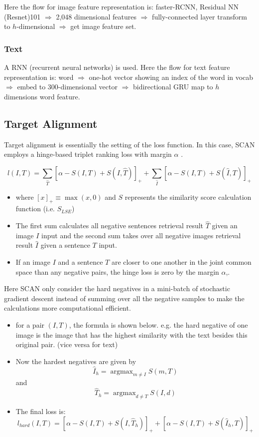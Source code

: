 Here the flow for image feature representation is: faster-RCNN, Residual NN (Resnet)101 $\Rightarrow$ 2,048 dimensional features $\Rightarrow$ fully-connected layer transform to $h$-dimensional $\Rightarrow$ get image feature set.

\subsubsection{Text}A RNN (recurrent neural networks) is used. Here the flow for text feature representation is: word $\Rightarrow$ one-hot vector showing an index of the word in vocab $\Rightarrow$ embed to 300-dimensional vector $\Rightarrow$ bidirectional GRU map to $h$ dimensions word feature.

\subsection{Target Alignment}
Target alignment is essentially the setting of the loss function. In this case, SCAN employs a hinge-based triplet ranking loss with margin $\alpha$ \cite{scan}.

$$
l(I, T)=\sum_{\hat{T}}[\alpha-S(I, T)+S(I, \hat{T})]_{+}+\sum_{\hat{I}}[\alpha-S(I, T)+S(\hat{I}, T)]_{+}
$$

\begin{itemize}
    \item where $[x]_{+} \equiv \max (x, 0)$ and $S$ represents the similarity score calculation function (i.e. $S_{L S E}$)
    \item The first sum calculates all negative sentences retrieval result $\hat{T}$ given an image $I$ input and the second sum takes over all negative images retrieval result $\hat{I}$ given a sentence $T$ input.
    \item If an image $I$ and a sentence $T$ are closer to one another in the joint common space than any negative pairs, the hinge loss is zero by the margin $\alpha$,.
\end{itemize}

Here SCAN \cite{scan} only consider the hard negatives in a mini-batch of stochastic gradient descent instead of summing over all the negative samples to make the calculations more computational efficient.

\begin{itemize}
    \item for a pair $(I, T)$, the formula is shown below. e.g. the hard negative of one image is the image that has the highest similarity with the text besides this original pair. (vice versa for text)
    \item Now the hardest negatives are given by $$\hat{I}_{h}=\operatorname{argmax}_{m \neq I} S(m, T)$$ and $$\hat{T}_{h}=\operatorname{argmax}_{d \neq T} S(I, d)$$
    \item The final loss is: 
    $$l_{h a r d}(I, T)=\left[\alpha-S(I, T)+S\left(I, \hat{T}_{h}\right)\right]_{+}+\left[\alpha-S(I, T)+S\left(\hat{I}_{h}, T\right)\right]_{+}$$
\end{itemize}

